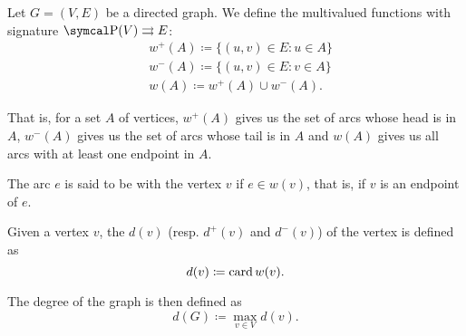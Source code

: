 \begin{definition}\label{def:graph_incidence}
  Let \( G = (V, E) \) be a directed graph. We define the multivalued functions with signature \( \Power(V) \MultTo E \):
  \begin{align*}
    &w^+(A) \coloneqq \{ (u, v) \in E \colon u \in A \} \\
    &w^-(A) \coloneqq \{ (u, v) \in E \colon v \in A \} \\
    &w(A) \coloneqq w^+(A) \cup w^-(A).
  \end{align*}

  That is, for a set \( A \) of vertices, \( w^+(A) \) gives us the set of arcs whose head is in \( A \), \( w^-(A) \) gives us the set of arcs whose tail is in \( A \) and \( w(A) \) gives us all arcs with at least one endpoint in \( A \).

  \begin{defenum}
     The arc \( e \) is said to be  with the vertex \( v \) if \( e \in w(v) \), that is, if \( v \) is an endpoint of \( e \).

    \cite[chapter 1, section 1.4]{Gondran1984} Given a vertex \( v \), the  \( d(v) \) (resp.  \( d^+(v) \) and  \( d^-(v) \)) of the vertex is defined as
    \begin{equation*}
      d(v) \coloneqq \operatorname{card} w(v).
    \end{equation*}

    The degree of the graph is then defined as
    \begin{equation*}
      d(G) \coloneqq \max_{v \in V} d(v).
    \end{equation*}
  \end{defenum}
\end{definition}

